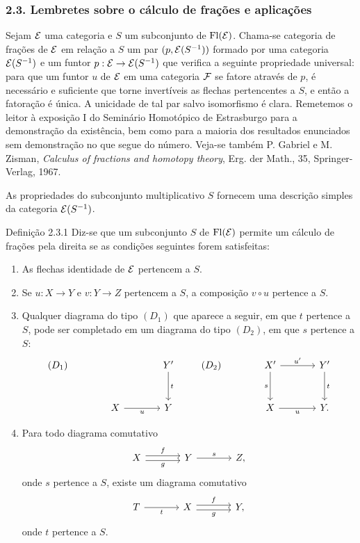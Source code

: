 \subsubsection*{2.3. Lembretes sobre o cálculo de frações e aplicações}
Sejam $\mathcal E$ uma categoria e $S$ um subconjunto de $\operatorname{Fl}(\mathcal E)$. Chama-se categoria de frações de $\mathcal E$ em relação a $S$ um par $(p,\mathcal E(S^{-1}))$ formado por uma categoria $\mathcal E(S^{-1})$ e um funtor $p:\mathcal E\to\mathcal E(S^{-1})$ que verifica a seguinte propriedade universal: para que um funtor $u$ de $\mathcal E$ em uma categoria $\mathcal F$ se fatore através de $p$, é necessário e suficiente que torne invertíveis as flechas pertencentes a $S$, e então a fatoração é única. A unicidade de tal par salvo isomorfismo é clara. Remetemos o leitor à exposição I do Seminário Homotópico de Estrasburgo para a demonstração da existência, bem como para a maioria dos resultados enunciados sem demonstração no que segue do número. Veja-se também P. Gabriel e M. Zisman, \emph{Calculus of fractions and homotopy theory}, Erg. der Math., 35, Springer-Verlag, 1967.

As propriedades do subconjunto multiplicativo $S$ fornecem uma descrição simples da categoria $\mathcal E(S^{-1})$.

\begin{statement}{Definição 2.3.1}
Diz-se que um subconjunto $S$ de $\operatorname{Fl}(\mathcal E)$ permite um cálculo de frações pela direita se as condições seguintes forem satisfeitas:
\begin{enumerate}[label=(\alph*)]
\item As flechas identidade de $\mathcal E$ pertencem a $S$.
\item Se $u:X\to Y$ e $v:Y\to Z$ pertencem a $S$, a composição $v\circ u$ pertence a $S$.
\item Qualquer diagrama do tipo $(D_1)$ que aparece a seguir, em que $t$ pertence a $S$, pode ser completado em um diagrama do tipo $(D_2)$, em que $s$ pertence a $S$:
\[
\begin{tikzcd}[column sep=large,row sep=large]
(D_1)& & Y' \arrow[d,"t"]\\
& X \arrow[r,"u"'] & Y
\end{tikzcd}
\qquad
\begin{tikzcd}[column sep=large,row sep=large]
(D_2)& X' \arrow[r,"u'"] \arrow[d,"s"'] & Y' \arrow[d,"t"]\\
& X \arrow[r,"u"'] & Y .
\end{tikzcd}
\]
\item Para todo diagrama comutativo
\[
\begin{tikzcd}[column sep=large]
X \arrow[r,shift left,"f"] \arrow[r,shift right,"g"'] & Y \arrow[r,"s"] & Z,
\end{tikzcd}
\]
onde $s$ pertence a $S$, existe um diagrama comutativo
\[
\begin{tikzcd}[column sep=large]
T \arrow[r,"t"'] & X \arrow[r,shift left,"f"] \arrow[r,shift right,"g"'] & Y,
\end{tikzcd}
\]
onde $t$ pertence a $S$.
\end{enumerate}
\end{statement}

